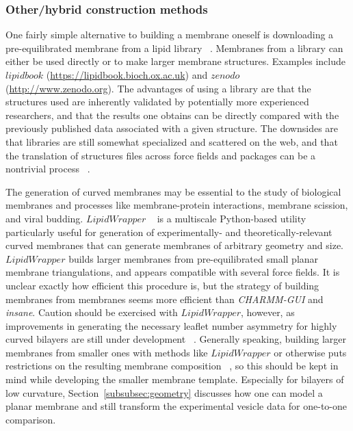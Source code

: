 \documentclass[9pt,bestpractices,pubversion]{livecoms}
\begin{document}
\subsubsection{Other/hybrid construction methods}
\label{subsubsec:otherandhybridmtds}
One fairly simple alternative to building a membrane oneself is downloading a pre-equilibrated membrane from a lipid library ~\cite{Javanainen2016}.
Membranes from a library can either be used directly or to make larger membrane structures.
Examples include $lipidbook$ (\url{https://lipidbook.bioch.ox.ac.uk}) and $zenodo$ (\url{http://www.zenodo.org}).
The advantages of using a library are that the structures used are inherently validated by potentially more experienced researchers, and that the results one obtains can be directly compared with the previously published data associated with a given structure.
The downsides are that libraries are still somewhat specialized and scattered on the web, and that the translation of structures files across force fields and packages can be a nontrivial process ~\cite{Javanainen2016}.

The generation of curved membranes may be essential to the study of biological membranes and processes like membrane-protein interactions, membrane scission, and viral budding.
$LipidWrapper$ ~\cite{Durrant2014} is a multiscale Python-based utility particularly useful for generation of experimentally- and theoretically-relevant curved membranes that can generate membranes of arbitrary geometry and size.
$LipidWrapper$ builds larger membranes from pre-equilibrated small planar membrane triangulations, and appears compatible with several force fields.
It is unclear exactly how efficient this procedure is, but the strategy of building membranes from membranes seems more efficient than \textit{CHARMM-GUI} and \textit{insane}.
Caution should be exercised with $LipidWrapper$, however, as improvements in generating the necessary leaflet number asymmetry for highly curved bilayers are still under development ~\cite{Durrant2014}.
Generally speaking, building larger membranes from smaller ones with methods like $LipidWrapper$ or otherwise puts restrictions on the resulting membrane composition ~\cite{Wassenaar2015a}, so this should be kept in mind while developing the smaller membrane template.
Especially for bilayers of low curvature, Section~\ref{subsubsec:geometry} discusses how one can model a planar membrane and still transform the experimental vesicle data for one-to-one comparison.
\end{document}
